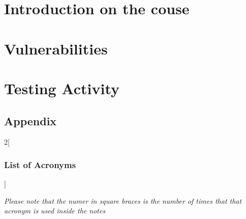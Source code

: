 \documentclass[11pt, a4paper, twoside, titlepage]{scrbook}
\begin{document}
\clearpage



\cleardoublepage

\tableofcontents
\cleardoublepage

\mainmatter



\cleardoublepage

\begingroup
\renewcommand\thepart{O}
\part{Introduction on the couse}
\endgroup





\part{Vulnerabilities}






\part{Testing Activity}

\backmatter
\chapter{Appendix}


\clearpage
\setlength{\columnsep}{1cm}

\begin{multicols}{2}[\section{List of Acronyms}]
    \renewcommand{\glossarysection}[2][]{}
    \printglossary[type=\acronymtype]
\end{multicols}
\vfill
{\footnotesize\textit{Please note that the numer in square braces is the number of times that that acronym is used inside the notes}}
\end{document}
